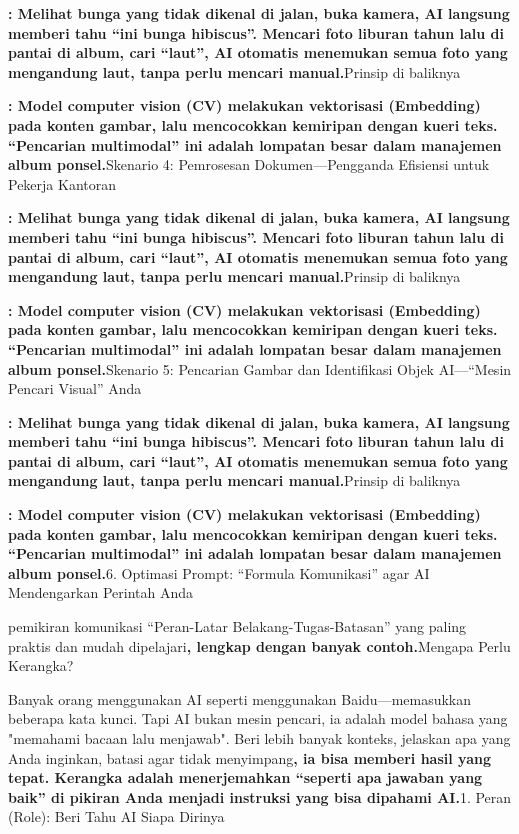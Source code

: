 
\textbf{: Melihat bunga yang tidak dikenal di jalan, buka kamera, AI langsung memberi tahu “ini bunga hibiscus”. Mencari foto liburan tahun lalu di pantai di album, cari “laut”, AI otomatis menemukan semua foto yang mengandung laut, tanpa perlu mencari manual.}Prinsip di baliknya

\textbf{: Model computer vision (CV) melakukan vektorisasi (Embedding) pada konten gambar, lalu mencocokkan kemiripan dengan kueri teks. “Pencarian multimodal” ini adalah lompatan besar dalam manajemen album ponsel.}Skenario 4: Pemrosesan Dokumen—Pengganda Efisiensi untuk Pekerja Kantoran


\textbf{: Melihat bunga yang tidak dikenal di jalan, buka kamera, AI langsung memberi tahu “ini bunga hibiscus”. Mencari foto liburan tahun lalu di pantai di album, cari “laut”, AI otomatis menemukan semua foto yang mengandung laut, tanpa perlu mencari manual.}Prinsip di baliknya

\textbf{: Model computer vision (CV) melakukan vektorisasi (Embedding) pada konten gambar, lalu mencocokkan kemiripan dengan kueri teks. “Pencarian multimodal” ini adalah lompatan besar dalam manajemen album ponsel.}Skenario 5: Pencarian Gambar dan Identifikasi Objek AI—“Mesin Pencari Visual” Anda


\textbf{: Melihat bunga yang tidak dikenal di jalan, buka kamera, AI langsung memberi tahu “ini bunga hibiscus”. Mencari foto liburan tahun lalu di pantai di album, cari “laut”, AI otomatis menemukan semua foto yang mengandung laut, tanpa perlu mencari manual.}Prinsip di baliknya

\textbf{: Model computer vision (CV) melakukan vektorisasi (Embedding) pada konten gambar, lalu mencocokkan kemiripan dengan kueri teks. “Pencarian multimodal” ini adalah lompatan besar dalam manajemen album ponsel.}6. Optimasi Prompt: “Formula Komunikasi” agar AI Mendengarkan Perintah Anda


pemikiran komunikasi “Peran-Latar Belakang-Tugas-Batasan” yang paling praktis dan mudah dipelajari\textbf{, lengkap dengan banyak contoh.}Mengapa Perlu Kerangka?

\begin{tcbinfo}{Banyak orang menggunakan AI seperti menggunakan Baidu—memasukkan beberapa kata kunci. Tapi AI bukan mesin pencari, ia adalah model bahasa yang "memahami bacaan lalu menjawab".}
Beri lebih banyak konteks, jelaskan apa yang Anda inginkan, batasi agar tidak menyimpang\textbf{, ia bisa memberi hasil yang tepat. Kerangka adalah menerjemahkan “seperti apa jawaban yang baik” di pikiran Anda menjadi instruksi yang bisa dipahami AI.}1. Peran (Role): Beri Tahu AI Siapa Dirinya

\end{tcbinfo}

